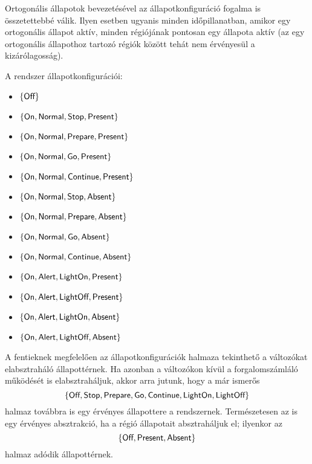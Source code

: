
Ortogonális állapotok bevezetésével az állapotkonfiguráció fogalma is összetettebbé válik. Ilyen esetben ugyanis minden időpillanatban, amikor egy ortogonális állapot aktív, minden régiójának pontosan egy állapota aktív (az egy ortogonális állapothoz tartozó régiók között tehát nem érvényesül a kizárólagosság).

\begin{megjegyzes}
A rendszer állapotkonfigurációi:

\begin{itemize}
\item $\{ \textsf{Off} \}$
\item $\{ \textsf{On}, \textsf{Normal}, \textsf{Stop}, \textsf{Present} \}$
\item $\{ \textsf{On}, \textsf{Normal}, \textsf{Prepare}, \textsf{Present} \}$
\item $\{ \textsf{On}, \textsf{Normal}, \textsf{Go}, \textsf{Present} \}$
\item $\{ \textsf{On}, \textsf{Normal}, \textsf{Continue}, \textsf{Present} \}$
\item $\{ \textsf{On}, \textsf{Normal}, \textsf{Stop}, \textsf{Absent} \}$
\item $\{ \textsf{On}, \textsf{Normal}, \textsf{Prepare}, \textsf{Absent} \}$
\item $\{ \textsf{On}, \textsf{Normal}, \textsf{Go}, \textsf{Absent} \}$
\item $\{ \textsf{On}, \textsf{Normal}, \textsf{Continue}, \textsf{Absent} \}$
\item $\{ \textsf{On}, \textsf{Alert}, \textsf{LightOn}, \textsf{Present} \}$
\item $\{ \textsf{On}, \textsf{Alert}, \textsf{LightOff}, \textsf{Present} \}$
\item $\{ \textsf{On}, \textsf{Alert}, \textsf{LightOn}, \textsf{Absent} \}$
\item $\{ \textsf{On}, \textsf{Alert}, \textsf{LightOff}, \textsf{Absent} \}$
\end{itemize}
\end{megjegyzes}

\begin{megjegyzes}
A fentieknek megfelelően az állapotkonfigurációk halmaza tekinthető a változókat elabsztraháló állapottérnek. Ha azonban a változókon kívül a forgalomszámláló működését is elabsztraháljuk, akkor arra jutunk, hogy a már ismerős
$$\{ \textsf{Off}, \textsf{Stop}, \textsf{Prepare}, \textsf{Go}, \textsf{Continue}, \textsf{LightOn}, \textsf{LightOff} \}$$
halmaz továbbra is egy érvényes állapottere a rendszernek. Természetesen az is egy érvényes absztrakció, ha a  régió állapotait absztraháljuk el; ilyenkor az
$$\{ \textsf{Off}, \textsf{Present}, \textsf{Absent} \}$$
halmaz adódik állapottérnek.
\end{megjegyzes}

